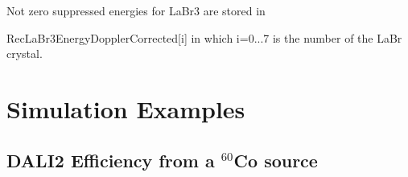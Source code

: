\documentclass[12pt]{book}
\begin{document}
Not zero suppressed energies for LaBr3 are stored in
\linebreak
{\ttfamily RecLaBr3EnergyDopplerCorrected[i]
\linebreak
in which i=0...7 is the number of the LaBr crystal.

















\chapter{Simulation Examples}

\section{DALI2 Efficiency from a $^{60}$Co source}

}
\end{document}
